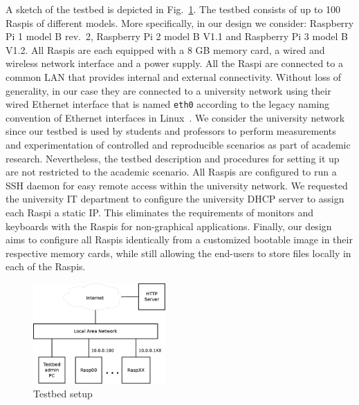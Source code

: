 \label{sec:overview}

A sketch of the testbed is depicted in Fig.~\ref{fig:testbed_setup}.
The testbed consists of up to 100 \ac{Raspi}s of different models.
More specifically, in our design we consider: Raspberry Pi 1 model B rev.~2,
Raspberry Pi 2 model B V1.1 and Raspberry Pi 3 model B V1.2.
All \ac{Raspi}s are each equipped with a 8 GB memory card, a wired and wireless
network interface and a power supply. All the \ac{Raspi} are connected to
a common \ac{LAN} that provides internal and external connectivity. Without
loss of generality, in our case they are connected to a university network
using their wired Ethernet interface that is named \texttt{eth0} according
to the legacy naming convention of Ethernet interfaces in
Linux~\cite{PredictableNetworkInterfaceNames}. We consider the
university network since our testbed is used by students and
professors to perform measurements and experimentation of controlled and
reproducible scenarios as part of academic research. Nevertheless, the
testbed description and procedures for setting it up are not restricted
to the academic scenario. All \ac{Raspi}s are configured to run
a \ac{SSH} daemon for easy remote access within the university network.
We requested the university \ac{IT} department to configure the university
\ac{DHCP} server to assign each \ac{Raspi} a static \ac{IP}. This
eliminates the requirements of monitors and keyboards with the \ac{Raspi}s
for non-graphical applications. Finally, our design aims to configure all
\ac{Raspi}s identically from a customized bootable image in their
respective memory cards, while still allowing the end-users to store
files locally in each of the \ac{Raspi}s.

\begin{figure}[ht!]
\centering
\includegraphics[width=0.45\textwidth]{images/testbed_setup3.eps}
\caption{Testbed setup}
\label{fig:testbed_setup}
\end{figure}


